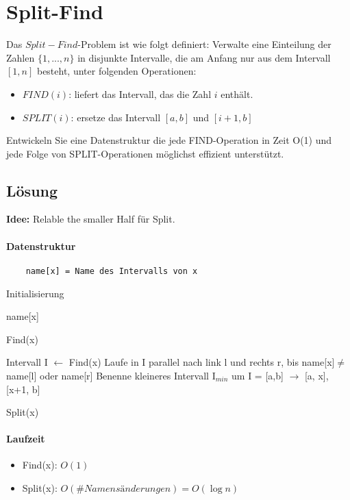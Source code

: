 \section{Split-Find}
	Das $Split-Find$-Problem ist wie folgt definiert: Verwalte eine Einteilung der Zahlen $\{1,...,n\}$ in disjunkte Intervalle, die am Anfang nur aus dem Intervall $[1,n]$ besteht, unter folgenden Operationen:
	\begin{itemize}
		\item $FIND(i)$: liefert das Intervall, das die Zahl $i$ enthält.
		\item $SPLIT(i)$: ersetze das Intervall $[a,b]$ und $[i+1,b]$
	\end{itemize}
	Entwickeln Sie eine Datenstruktur die jede FIND-Operation in Zeit O(1) und jede Folge von SPLIT-Operationen möglichst effizient unterstützt.

\subsection*{Lösung}
\textbf{Idee:} Relable the smaller Half für Split.
\paragraph{Datenstruktur}
\begin{verbatim}
    name[x] = Name des Intervalls von x
\end{verbatim}

\begin{algorithm}
\SetAlgoLined
{}
\caption{Initialisierung}
\end{algorithm}
\vspace{5mm}

\begin{algorithm}
\SetAlgoLined
\Return name[x]\;
\caption{Find(x)}
\end{algorithm}
\vspace{5mm}

\begin{algorithm}
\SetAlgoLined
Intervall I $ \gets $ Find(x)\;
Laufe in I parallel nach link l und rechts r, bis name[x]$ \neq $ name[l] oder name[r]\;
Benenne kleineres Intervall I$_{min} $ um\;
I = [a,b] $\rightarrow$ [a, x], [x+1, b]\;
\caption{Split(x)}
\end{algorithm}

\paragraph{Laufzeit}
\begin{itemize}
    \item[] Find(x): $ O(1) $
    \item[] Split(x): $ O(\# Namensänderungen) = O(\log n) $
\end{itemize}


